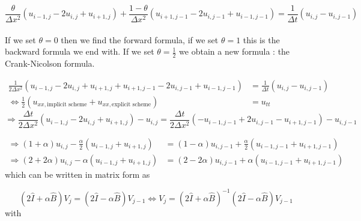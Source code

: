 \documentclass[a4paper, twoside, 11pt]{report}
\theoremstyle{theorem}
\theoremstyle{remark}
\theoremstyle{exemple}
\begin{document}
                    \begin{equation*}
                        \frac{\theta}{\Delta x^2}(u_{i-1,j}-2u_{i,j}+u_{i+1,j})+\frac{1-\theta}{\Delta x^2}(u_{i+1,j-1}-2u_{i,j-1}+u_{i-1,j-1}) = \frac{1}{\Delta t}(u_{i,j}-u_{i,j-1})
                        \tag{6}
                    \end{equation*}
                    \paragraph{}If we set $\theta = 0$ then we find the forward formula, if we set $\theta=1$ this is the backward formula we end with. If we set $\displaystyle \theta=\frac{1}{2}$ we obtain a new formula : the Crank-Nicolson formula.

                    \begin{align*}
                        \frac{1}{2\Delta x^2}(u_{i-1,j}-2u_{i,j}+u_{i+1,j}+u_{i+1,j-1}-2u_{i,j-1}+u_{i-1,j-1}) &= \frac{1}{\Delta t}(u_{i,j}-u_{i,j-1}) \\
                        \Longleftrightarrow\frac{1}{2}({u}_{xx, \text{implicit scheme}} + {u}_{xx, \text{explicit scheme}}) &= u_{tt}
                    \end{align*}
                    \[
                        \Longrightarrow\frac{\Delta t}{2\Delta x^2}(u_{i-1,j} - 2u_{i,j} + u_{i+1,j})-u_{i,j} = \frac{\Delta t}{2\Delta x^2}(-u_{i-1,j-1}+2u_{i,j-1}-u_{i+1,j-1})-u_{i,j-1}
                    \]

                    \begin{align*}
                        \Longrightarrow (1+\alpha)u_{i,j}-\frac{\alpha}{2}(u_{i-1,j}+u_{i+1,j}) &= (1-\alpha)u_{i,j-1}+\frac{\alpha}{2}(u_{i-1,j-1}+u_{i+1,j-1})\\
                        \Longrightarrow (2+2\alpha)u_{i,j}-\alpha(u_{i-1,j}+u_{i+1,j}) &= (2-2\alpha)u_{i,j-1}+\alpha(u_{i-1,j-1}+u_{i+1,j-1}) \tag{7}
                    \end{align*}
                    which can be written in matrix form as

                    \begin{equation*}
                        (2\hat{I}+\alpha\hat{B})V_j=(2\hat{I}-\alpha \hat{B})V_{j-1} \Longleftrightarrow V_j = (2\hat{I}+\alpha \hat{B})^{-1}(2\hat{I}-\alpha \hat{B})V_{j-1}
                    \end{equation*}
                    with
\end{document}
